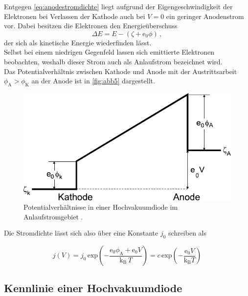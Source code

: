 Entgegen \eqref{eq:anodestromdichte} liegt aufgrund der Eigengeschwindigkeit der Elektronen bei Verlassen
der Kathode auch bei $V = 0$ ein geringer Anodenstrom vor.
Dabei besitzen die Elektronen den Energieüberschuss
\begin{equation*}
    \Delta E = E - (\zeta + \text{e}_0 \phi) \,,
\end{equation*}
der sich als kinetische Energie wiederfinden lässt. \\

Selbst bei einem niedrigen Gegenfeld lassen sich emittierte Elektronen beobachten,
weshalb dieser Strom auch als Anlaufstrom bezeichnet wird. \\

Das Potentialverhältnis zwischen Kathode und Anode mit der
Austrittsarbeit $\phi_\text{A} > \phi_\text{K}$ an der Anode
ist in \autoref{fig:abb5} dargestellt.

\begin{figure}[H]
    \centering
    \includegraphics{figures/Abb5.pdf}
    \caption{Potentialverhältnisse in einer Hochvakuumdiode im Anlaufstromgebiet \cite{ap09}.}
    \label{fig:abb5}
\end{figure}

Die Stromdichte lässt sich also über eine Konstante $j_0$ schreiben als

\begin{equation}
    j(V) = j_0 \, \text{exp}\left(-\dfrac{\text{e}_0 \phi_\text{A} + \text{e}_0 V}{\text{k}_\text{B} \, T} \right)
         = c \,\text{exp}\left(-\dfrac{\text{e}_0 V}{\text{k}_\text{B} T} \right)
         \label{eq:stromladexp}
\end{equation}


\subsection{Kennlinie einer Hochvakuumdiode}

